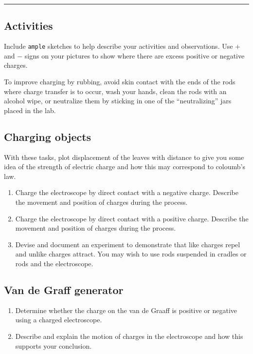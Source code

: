 \hrule
\begin{multicols}{2}
\section{Activities}
Include \texttt{ample} sketches to help describe your activities and observations. Use $+$ and $-$ signs on your pictures to show where there are excess positive or negative charges. 

To improve charging by rubbing, avoid skin contact with the ends of the rods where charge transfer is to occur, wash your hands, clean the rods with an alcohol wipe, or neutralize them by sticking in one of the ``neutralizing'' jars placed in the lab.

\subsection{Charging objects}
With these tasks, plot displacement of the leaves with distance to give you some idea of the strength of electric charge and how this may correspond to coloumb's law.
\begin{enumerate}
	 \item Charge the electroscope by direct contact with a negative charge.  Describe the movement and position of charges during the process.
	 \item Charge the electroscope by direct contact with a positive charge.  Describe the movement and position of charges during the process.
	 \item  Devise and document an experiment to demonstrate that like charges repel and unlike charges attract.  You may wish to use rods suspended in cradles or rods and the electroscope.
\end{enumerate}

\subsection{Van de Graff generator}
\begin{enumerate}[resume]
	 \item Determine whether the charge on the van de Graaff is positive or negative using a charged electroscope.  
	 \item Describe and explain the motion of charges in the electroscope and how this supports your conclusion.
\end{enumerate}


\end{multicols}
